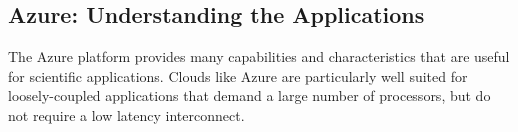 \documentclass[3p,twocolumn]{elsarticle}
\begin{document}
\subsection{Azure: Understanding the Applications}

The Azure platform provides many capabilities and characteristics that
are useful for scientific applications. Clouds like Azure are
particularly well suited for loosely-coupled applications that demand
a large number of processors, but do not require a low latency
interconnect. 

\end{document}
